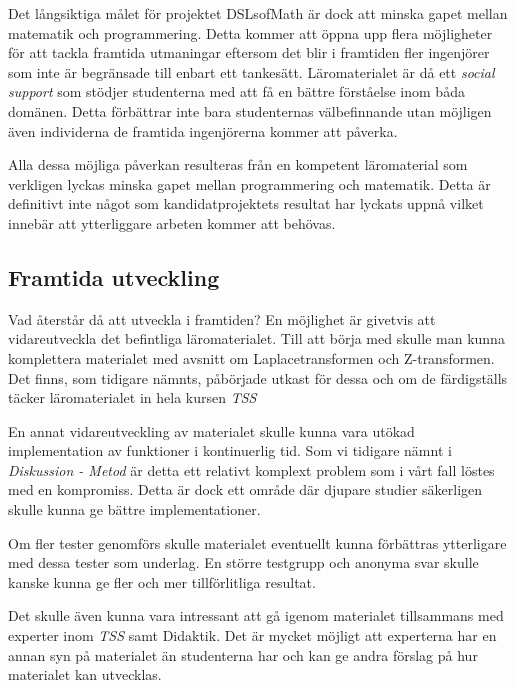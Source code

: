 \documentclass[]{article}
\begin{document}
Det långsiktiga målet för projektet DSLsofMath är dock att minska gapet
mellan matematik och programmering. %
Detta kommer att öppna upp flera möjligheter för att tackla framtida
utmaningar eftersom det blir i framtiden fler ingenjörer som inte är
begränsade till enbart ett tankesätt.
Läromaterialet är då ett \emph{social support} som stödjer studenterna
med att få en bättre förståelse inom båda domänen. Detta förbättrar inte
bara studenternas välbefinnande utan möjligen även individerna de framtida
ingenjörerna kommer att påverka.

Alla dessa möjliga påverkan resulteras från en kompetent läromaterial som
verkligen lyckas minska gapet mellan programmering och matematik. Detta är
definitivt inte något som kandidatprojektets resultat har lyckats uppnå vilket
innebär att ytterliggare arbeten kommer att behövas.

\subsection{Framtida utveckling}
Vad återstår då att utveckla i framtiden? En möjlighet är givetvis att
vidareutveckla det befintliga läromaterialet. Till att börja med
skulle man kunna komplettera materialet med avsnitt om
Laplacetransformen och Z-transformen. Det finns, som tidigare nämnts,
påbörjade utkast för dessa och om de färdigställs täcker
läromaterialet in hela kursen \textit{TSS}

En annat vidareutveckling av materialet skulle kunna vara utökad
implementation av funktioner i kontinuerlig tid. Som vi tidigare nämnt
i \textit{Diskussion - Metod} är detta ett relativt komplext problem
som i vårt fall löstes med en kompromiss. Detta är dock ett område där
djupare studier säkerligen skulle kunna ge bättre implementationer.

Om fler tester genomförs skulle materialet eventuellt kunna förbättras
ytterligare med dessa tester som underlag. En större testgrupp och
anonyma svar skulle kanske kunna ge fler och mer tillförlitliga
resultat.

Det skulle även kunna vara intressant att gå igenom materialet
tillsammans med experter inom \textit{TSS} samt Didaktik. Det är
mycket möjligt att experterna har en annan syn på materialet än
studenterna har och kan ge andra förslag på hur materialet kan
utvecklas.
\end{document}
